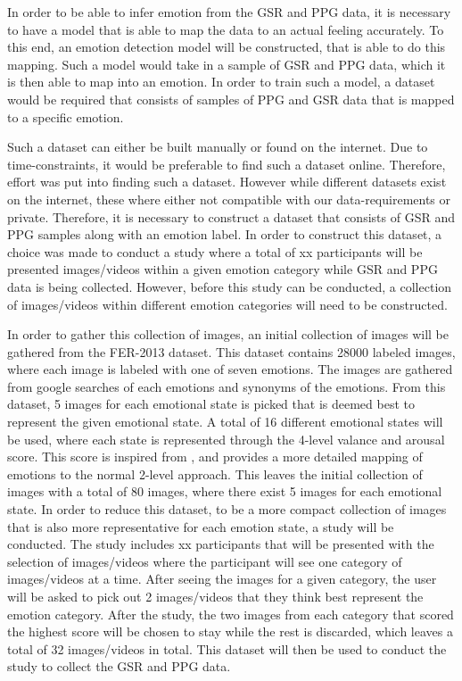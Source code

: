 In order to be able to infer emotion from the GSR and PPG data, it is necessary to have a model that is able to map the data to an actual feeling accurately. To this end, an emotion detection model will be constructed, that is able to do this mapping. Such a model would take in a sample of GSR and PPG data, which it is then able to map into an emotion. In order to train such a model, a dataset would be required that consists of samples of PPG and GSR data that is mapped to a specific emotion. 

Such a dataset can either be built manually or found on the internet. Due to time-constraints, it would be preferable to find such a dataset online. Therefore, effort was put into finding such a dataset. However while different datasets exist on the internet, these where either not compatible with our data-requirements or private. Therefore, it is necessary to construct a dataset that consists of GSR and PPG samples along with an emotion label. In order to construct this dataset, a choice was made to conduct a study where a total of xx participants will be presented images/videos within a given emotion category while GSR and PPG data is being collected. However, before this study can be conducted, a collection of images/videos within different emotion categories will need to be constructed. 

In order to gather this collection of images, an initial collection of images will be gathered from the FER-2013\cite{dataset} dataset. This dataset contains 28000 labeled images, where each image is labeled with one of seven emotions. The images are gathered from google searches of each emotions and synonyms of the emotions. From this dataset, 5 images for each emotional state is picked that is deemed best to represent the given emotional state.
A total of 16 different emotional states will be used, where each state is represented through the 4-level valance and arousal score. This score is inspired from \cite{CNNEmotionDetection}, and provides a more detailed mapping of emotions to the normal 2-level approach.
This leaves the initial collection of images with a total of 80 images, where there exist 5 images for each emotional state.
In order to reduce this dataset, to be a more compact collection of images that is also more representative for each emotion state, a study will be conducted.
The study includes xx participants that will be presented with the selection of images/videos where the participant will see one category of images/videos at a time. After seeing the images for a given category, the user will be asked to pick out 2 images/videos that they think best represent the emotion category. After the study, the two images from each category that scored the highest score will be chosen to stay while the rest is discarded, which leaves a total of 32 images/videos in total. This dataset will then be used to conduct the study to collect the GSR and PPG data. 

